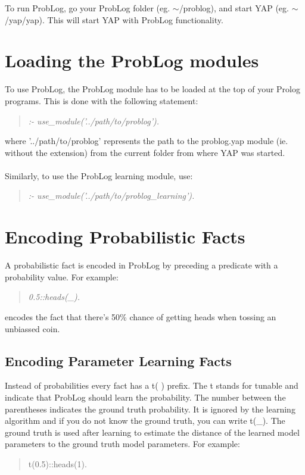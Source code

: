 \documentclass[a4paper,12pt]{article}
\begin{document}
To run ProbLog, go your ProbLog folder (eg. $\sim$/problog), and start YAP (eg. $\sim$/yap/yap). This will start YAP with ProbLog functionality.

\section{Loading the ProbLog modules}

To use ProbLog, the ProbLog module has to be loaded at the top of your Prolog programs. This is done with the following statement:
\begin{quotation}
\textit{:- use\_module('../path/to/problog').}
\end{quotation}
where '../path/to/problog' represents the path to the problog.yap module (ie. without the extension) from the current folder from where YAP was started.

\paragraph{}
Similarly, to use the ProbLog learning module, use:
\begin{quotation}
\textit{:- use\_module('../path/to/problog\_learning').}
\end{quotation}

\section{Encoding Probabilistic Facts}
A probabilistic fact is encoded in ProbLog by preceding a predicate with a probability value. For example:
\begin{quotation}
\textit{0.5::heads(\_).}
\end{quotation}
encodes the fact that there's 50\% chance of getting heads when tossing an unbiassed coin. 

\subsection{Encoding Parameter Learning Facts}

Instead of probabilities every fact has a t( ) prefix. The t stands for tunable and indicate that ProbLog should learn the probability. The number between the parentheses indicates the ground truth probability. It is ignored by the learning algorithm and if you do not know the ground truth, you can write t(\_). The ground truth is used after learning to estimate the distance of the learned model parameters to the ground truth model parameters. For example:
\begin{quotation}
t(0.5)::heads(1).
\end{quotation}
\end{document}
